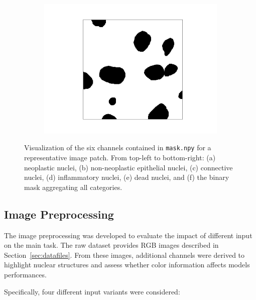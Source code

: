 \documentclass[target=bach,aauheader=,style=]{thud}
\begin{document}
\begin{figure}[ht]
\begin{subfigure}{0.32\textwidth}
  \includegraphics[width=\linewidth]{imgs/dataset/binary_mask.png}
  \caption{}
\end{subfigure}

\caption{Visualization of the six channels contained in \texttt{mask.npy} for a representative image patch.  
From top-left to bottom-right: (a) neoplastic nuclei, (b) non-neoplastic epithelial nuclei, (c) connective nuclei, (d) inflammatory nuclei, (e) dead nuclei, and (f) the binary mask aggregating all categories.}
\label{fig:2x3grid}
\end{figure}
\subsection{Image Preprocessing}
The image preprocessing was developed to evaluate the impact of different input on the main task. 
The raw dataset provides RGB images described in Section~\ref{sec:datafiles}. 
From these images, additional channels were derived to highlight nuclear structures and assess whether color information affects models performances. 

Specifically, four different input variants were considered:
\end{document}
